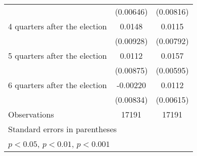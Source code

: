 \begin{table}[htbp]
\begin{tabular}{l*{2}{c}}
                    &   (0.00646)         &   (0.00816)         \\
[1em]
 4 quarters after the election&      0.0148         &      0.0115         \\
                    &   (0.00928)         &   (0.00792)         \\
[1em]
 5 quarters after the election&      0.0112         &      0.0157\sym{**} \\
                    &   (0.00875)         &   (0.00595)         \\
[1em]
 6 quarters after the election&    -0.00220         &      0.0112         \\
                    &   (0.00834)         &   (0.00615)         \\
\hline
Observations        &       17191         &       17191         \\
\hline\hline
\multicolumn{3}{l}{\footnotesize Standard errors in parentheses}\\
\multicolumn{3}{l}{\footnotesize \sym{*} \(p<0.05\), \sym{**} \(p<0.01\), \sym{***} \(p<0.001\)}\\
\end{tabular}
\end{table}

